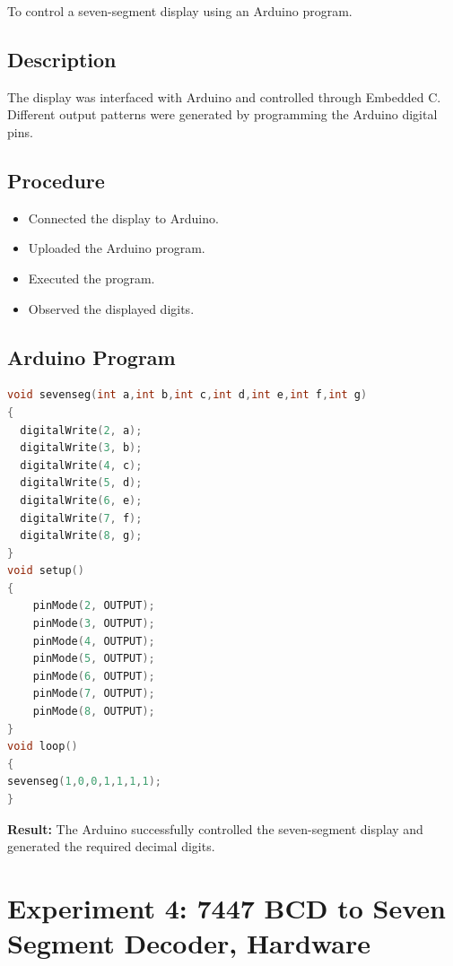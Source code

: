 \documentclass[12pt,a4paper]{report}
\begin{document}
To control a seven-segment display using an Arduino program.

\subsection*{Description}

The display was interfaced with Arduino and controlled through Embedded C. Different output patterns were generated by programming the Arduino digital pins.

\subsection*{Procedure}

\begin{itemize}
\item Connected the display to Arduino.
\item Uploaded the Arduino program.
\item Executed the program.
\item Observed the displayed digits.
\end{itemize}

\subsection*{Arduino Program}

\begin{lstlisting}[language=C++]
void sevenseg(int a,int b,int c,int d,int e,int f,int g)
{
  digitalWrite(2, a); 
  digitalWrite(3, b); 
  digitalWrite(4, c); 
  digitalWrite(5, d); 
  digitalWrite(6, e); 
  digitalWrite(7, f);     
  digitalWrite(8, g); 
}
void setup() 
{
    pinMode(2, OUTPUT);  
    pinMode(3, OUTPUT);
    pinMode(4, OUTPUT);
    pinMode(5, OUTPUT);
    pinMode(6, OUTPUT);
    pinMode(7, OUTPUT);
    pinMode(8, OUTPUT);            
}
void loop() 
{
sevenseg(1,0,0,1,1,1,1);  
}

\end{lstlisting}

\textbf{Result:} The Arduino successfully controlled the seven-segment display and generated the required decimal digits.

\section{Experiment 4: 7447 BCD to Seven Segment Decoder, Hardware}
\end{document}
